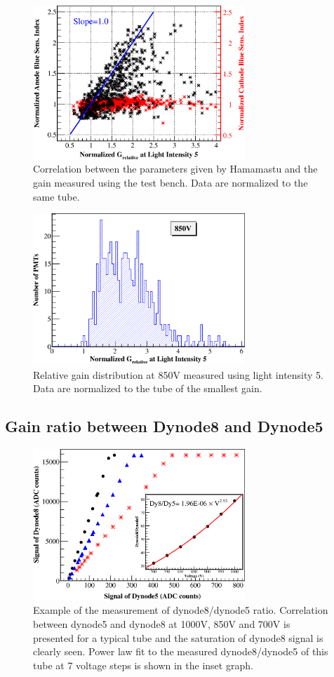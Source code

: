 \documentclass[5p, times]{elsarticle}
\begin{document}
\begin{figure}
 \centering
 \includegraphics[width=80mm]{correlation_new}
\caption{Correlation between the parameters given by Hamamastu and the gain measured using the test bench.
Data are normalized to the same tube.}
\label{fig:gain_correlation}
\end{figure} 

\begin{figure}
 \centering
 \includegraphics[width=80mm]{GainDist}
\caption{Relative gain distribution at 850V measured using light intensity 5.
Data are normalized to the tube of the smallest gain.}
\label{fig:gain_dist}
\end{figure}

\subsection{Gain ratio between Dynode8 and Dynode5}
\label{sec:psd_dy58}

\begin{figure}
 \centering
 \includegraphics[width=80mm]{dy58_example}
\caption{Example of the measurement of dynode8/dynode5 ratio.
Correlation between dynode5 and dynode8 at 1000V, 850V and 700V is presented for a typical tube and the saturation of dynode8 signal is clearly seen.
Power law fit to the measured dynode8/dynode5 of this tube at 7 voltage steps is shown in the inset graph.
}
\label{fig:dy58_example}
\end{figure} 
\end{document}
